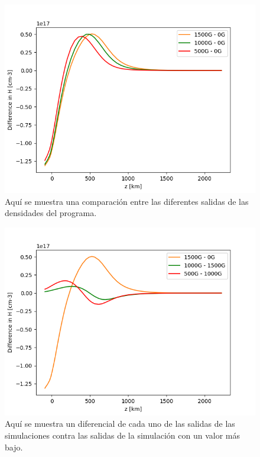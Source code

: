 \documentclass[9pt]{book}
\begin{document}
\begin{figure}[h]
\centering
\includegraphics[scale=1]{fe_diferencias_absolutas}
\caption{ Aqu\'i se muestra una comparaci\'on entre las diferentes salidas de las densidades del programa.}
\label{fe_diferencias_absolutas}
\end{figure}

\begin{figure}[h]
\centering
\includegraphics[scale=1]{fe_diferencias_relativas}
\caption{ Aqu\'i se muestra un diferencial de cada uno de las salidas de las simulaciones contra las salidas de la simulaci\'on con un valor m\'as bajo.}
\label{am_diferencias_relativas}
\label{fe_diferencias_relativas}
\end{figure}
\clearpage
\end{document}
